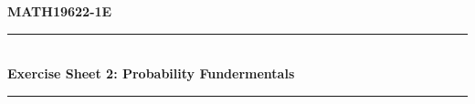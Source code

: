 \documentclass[11pt, a4paper]{article}
\begin{document}
\begin{center}
    \textbf{\large MATH19622-1E} \\
    \vspace{0.2cm}
    \rule{0.8\textwidth}{0.4pt} \\
    \vspace{0.4cm}
    \textbf{\Large Exercise Sheet 2: Probability Fundermentals} \\
    \vspace{0.4cm}
    \rule{0.8\textwidth}{0.4pt} \\
\end{center}
\vspace{0.6cm}


\end{document}

